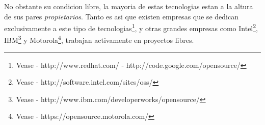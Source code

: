 No obstante su condicion libre, la mayoria de estas tecnologias estan a la
altura de sus pares \emph{propietarios}. Tanto es asi que existen empresas que
se dedican exclusivamente a este tipo de tecnologias\footnote{Vease -
http://www.redhat.com/ - http://code.google.com/opensource/}, y otras grandes
empresas como Intel\footnote{Vease - http://software.intel.com/sites/oss/},
IBM\footnote{Vease - http://www.ibm.com/developerworks/opensource/} y
Motorola\footnote{Vease - https://opensource.motorola.com/}, trabajan
activamente en proyectos libres.\\
